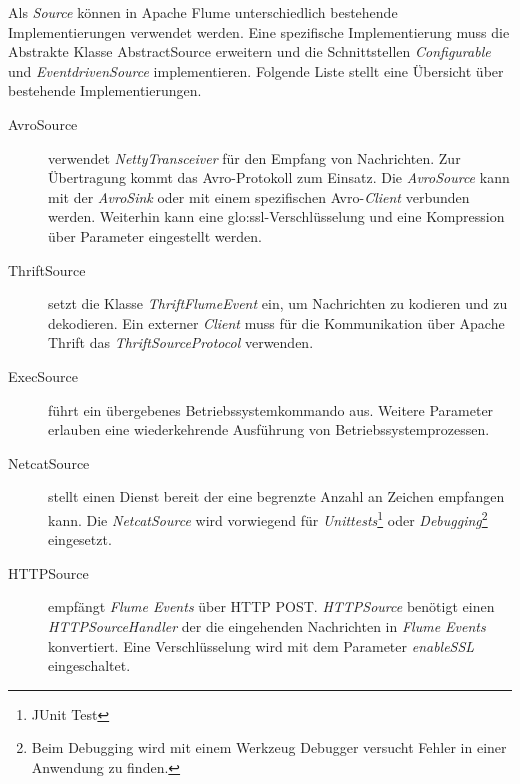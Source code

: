Als \textit{Source} können in Apache Flume unterschiedlich bestehende Implementierungen verwendet werden. Eine spezifische Implementierung muss die Abstrakte Klasse AbstractSource  erweitern und die Schnittstellen \textit{Configurable} und \textit{EventdrivenSource} implementieren. Folgende Liste stellt eine Übersicht über bestehende Implementierungen.
\begin{description}
	\item[AvroSource] verwendet \textit{NettyTransceiver} für den Empfang von Nachrichten. Zur Übertragung kommt das Avro-Protokoll zum Einsatz. Die \textit{AvroSource} kann mit der \textit{AvroSink} oder mit einem spezifischen Avro-\textit{Client} verbunden werden. Weiterhin kann eine \gls{glo:ssl}-Verschlüsselung und eine Kompression über Parameter eingestellt werden.
	\item[ThriftSource] setzt die Klasse \textit{ThriftFlumeEvent} ein, um Nachrichten zu kodieren und zu dekodieren. Ein externer \textit{Client} muss für die Kommunikation über Apache Thrift das \textit{ThriftSourceProtocol} verwenden. 
	\item[ExecSource] führt ein übergebenes Betriebssystemkommando aus. Weitere Parameter erlauben eine wiederkehrende Ausführung von Betriebssystemprozessen.
	\item[NetcatSource] stellt einen Dienst bereit der eine begrenzte Anzahl an Zeichen empfangen kann. Die \textit{NetcatSource} wird vorwiegend für \textit{Unittests}\footnote{JUnit Test } oder \textit{Debugging}\footnote{Beim Debugging wird mit einem Werkzeug Debugger versucht Fehler in einer Anwendung zu finden.} eingesetzt. 
	\item[HTTPSource] empfängt \textit{Flume Events} über HTTP POST. \textit{HTTPSource} benötigt einen \textit{HTTPSourceHandler} der die eingehenden Nachrichten in \textit{Flume Events} konvertiert. Eine Verschlüsselung wird mit dem Parameter \textit{enableSSL} eingeschaltet. 
\end{description}

